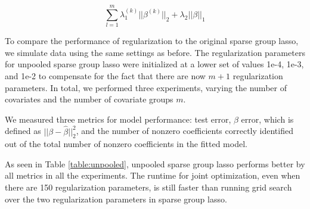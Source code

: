 \documentclass[10pt,letterpaper]{article}
\begin{document}
\begin{equation}
\sum_{l=1}^m \lambda_1^{(k)} \lvert\lvert \beta^{(k)} \rvert \rvert_2
+ \lambda_2 \lvert\lvert \beta \rvert \rvert_1
\end{equation}

To compare the performance of regularization to the original sparse group lasso, we simulate data using the same settings as before. The regularization parameters for unpooled sparse group lasso were initialized at a lower set of values 1e-4, 1e-3, and 1e-2 to compensate for the fact that there are now $m + 1$ regularization parameters. In total, we performed three experiments, varying the number of covariates and the number of covariate groups $m$. 

We measured three metrics for model performance: test error, $\beta$ error, which is defined as $\lvert \lvert \beta - \hat \beta \rvert \rvert_2 ^2$, and the number of nonzero coefficients correctly identified out of the total number of nonzero coefficients in the fitted model.

As seen in Table \ref{table:unpooled}, unpooled sparse group lasso performs better by all metrics in all the experiments. The runtime for joint optimization, even when there are 150 regularization parameters, is still faster than running grid search over the two regularization parameters in sparse group lasso.
\end{document}
